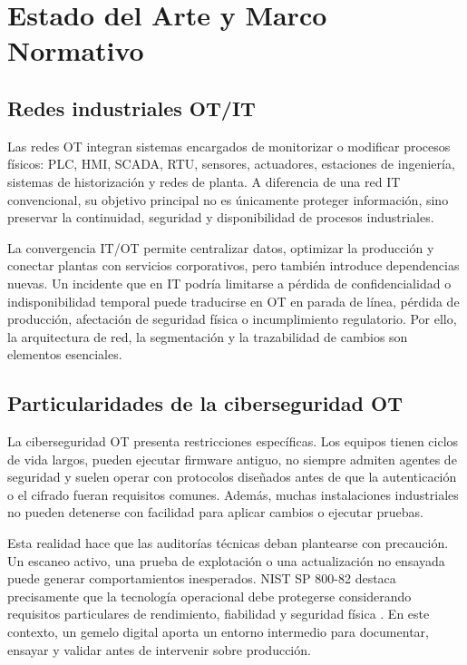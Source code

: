 \chapter{Estado del Arte y Marco Normativo} \label{ch:estado-arte}

\section{Redes industriales OT/IT} \label{sec:redes-ot-it}

Las redes OT integran sistemas encargados de monitorizar o modificar procesos físicos: PLC, HMI, SCADA, RTU, sensores, actuadores, estaciones de ingeniería, sistemas de historización y redes de planta. A diferencia de una red IT convencional, su objetivo principal no es únicamente proteger información, sino preservar la continuidad, seguridad y disponibilidad de procesos industriales.

La convergencia IT/OT permite centralizar datos, optimizar la producción y conectar plantas con servicios corporativos, pero también introduce dependencias nuevas. Un incidente que en IT podría limitarse a pérdida de confidencialidad o indisponibilidad temporal puede traducirse en OT en parada de línea, pérdida de producción, afectación de seguridad física o incumplimiento regulatorio. Por ello, la arquitectura de red, la segmentación y la trazabilidad de cambios son elementos esenciales.

\section{Particularidades de la ciberseguridad OT} \label{sec:particularidades-ot}

La ciberseguridad OT presenta restricciones específicas. Los equipos tienen ciclos de vida largos, pueden ejecutar firmware antiguo, no siempre admiten agentes de seguridad y suelen operar con protocolos diseñados antes de que la autenticación o el cifrado fueran requisitos comunes. Además, muchas instalaciones industriales no pueden detenerse con facilidad para aplicar cambios o ejecutar pruebas.

Esta realidad hace que las auditorías técnicas deban plantearse con precaución. Un escaneo activo, una prueba de explotación o una actualización no ensayada puede generar comportamientos inesperados. NIST SP 800-82 destaca precisamente que la tecnología operacional debe protegerse considerando requisitos particulares de rendimiento, fiabilidad y seguridad física \cite{nist80082}. En este contexto, un gemelo digital aporta un entorno intermedio para documentar, ensayar y validar antes de intervenir sobre producción.

